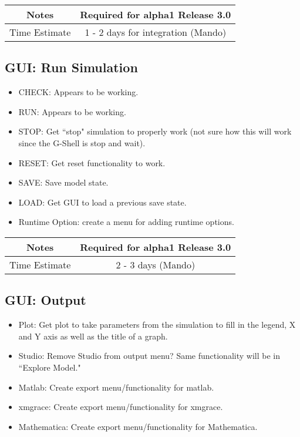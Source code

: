 \documentclass[12pt]{article}
\begin{document}
{
  \vspace{5mm}
  \centering
  \begin{tabular}{|c|c|}
    \hline
    Notes
    & Required for alpha1 Release 3.0 \\
    \hline
    Time Estimate
    & 1 - 2 days for integration (Mando)\\
    \hline
  \end{tabular}
}


\subsection{GUI: Run Simulation}
\begin{itemize}
\item CHECK: Appears to be working.
\item RUN: Appears to be working.      
\item STOP: Get ``stop" simulation to properly work (not sure how this
  will work since the G-Shell is stop and wait).
\item RESET: Get reset functionality to work.
\item SAVE: Save model state.
\item LOAD: Get GUI to load a previous save state.
\item Runtime Option: create a menu for adding runtime options.
\end{itemize}

{
  \vspace{5mm}
  \centering
  \begin{tabular}{|c|c|}
    \hline
    Notes
    & Required for alpha1 Release 3.0 \\
    \hline
    Time Estimate
    & 2 - 3 days (Mando) \\
    \hline
  \end{tabular}
}


\subsection{GUI: Output}
\begin{itemize}
\item Plot: Get plot to take parameters from the simulation to fill in
  the legend, X and Y axis as well as the title of a graph.
\item Studio: Remove Studio from output menu? Same functionality will be in ``Explore Model."
\item Matlab: Create export menu/functionality for matlab.
\item xmgrace: Create export menu/functionality for xmgrace.
\item Mathematica: Create export menu/functionality for Mathematica.
\end{itemize}
\end{document}
